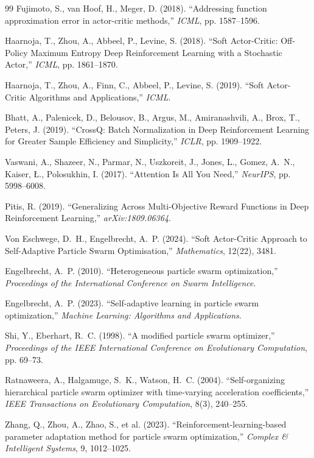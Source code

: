 \begin{thebibliography}{99}
Fujimoto, S., van Hoof, H., Meger, D. (2018).
``Addressing function approximation error in actor-critic methods,''
\textit{ICML}, pp. 1587--1596.

Haarnoja, T., Zhou, A., Abbeel, P., Levine, S. (2018).
``Soft Actor-Critic: Off-Policy Maximum Entropy Deep Reinforcement Learning with a Stochastic Actor,''
\textit{ICML}, pp. 1861--1870.

Haarnoja, T., Zhou, A., Finn, C., Abbeel, P., Levine, S. (2019).
``Soft Actor-Critic Algorithms and Applications,''
\textit{ICML}.

Bhatt, A., Palenicek, D., Belousov, B., Argus, M., Amiranashvili, A., Brox, T., Peters, J. (2019).
``CrossQ: Batch Normalization in Deep Reinforcement Learning for Greater Sample Efficiency and Simplicity,''
\textit{ICLR}, pp. 1909--1922.

Vaswani, A., Shazeer, N., Parmar, N., Uszkoreit, J., Jones, L., Gomez, A.~N., Kaiser, Ł., Polosukhin, I. (2017).
``Attention Is All You Need,''
\textit{NeurIPS}, pp. 5998--6008.

Pitis, R. (2019).
``Generalizing Across Multi-Objective Reward Functions in Deep Reinforcement Learning,''
\textit{arXiv:1809.06364}.

Von Eschwege, D.~H., Engelbrecht, A.~P. (2024).
``Soft Actor-Critic Approach to Self-Adaptive Particle Swarm Optimisation,''
\textit{Mathematics}, 12(22), 3481.

Engelbrecht, A.~P. (2010).
``Heterogeneous particle swarm optimization,''
\textit{Proceedings of the International Conference on Swarm Intelligence}.

Engelbrecht, A.~P. (2023).
``Self-adaptive learning in particle swarm optimization,''
\textit{Machine Learning: Algorithms and Applications}.

Shi, Y., Eberhart, R.~C. (1998).
``A modified particle swarm optimizer,''
\textit{Proceedings of the IEEE International Conference on Evolutionary Computation}, pp. 69--73.

Ratnaweera, A., Halgamuge, S.~K., Watson, H.~C. (2004).
``Self-organizing hierarchical particle swarm optimizer with time-varying acceleration coefficients,''
\textit{IEEE Transactions on Evolutionary Computation}, 8(3), 240--255.

Zhang, Q., Zhou, A., Zhao, S., et al. (2023).
``Reinforcement-learning-based parameter adaptation method for particle swarm optimization,''
\textit{Complex \& Intelligent Systems}, 9, 1012--1025.

\end{thebibliography}

